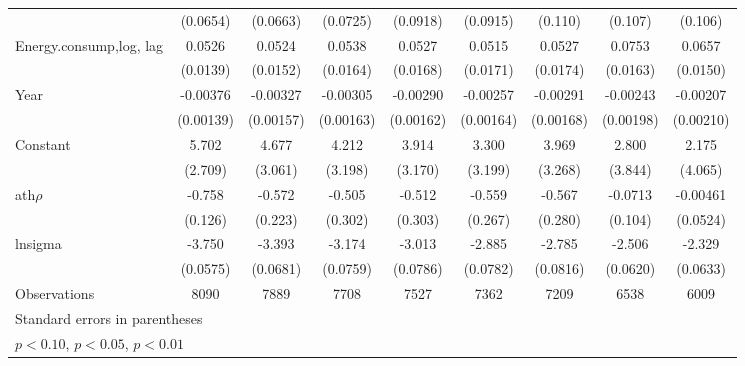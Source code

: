 \begin{table}[htbp]
\begin{tabular}{l*{8}{c}}
                    &    (0.0654)         &    (0.0663)         &    (0.0725)         &    (0.0918)         &    (0.0915)         &     (0.110)         &     (0.107)         &     (0.106)         \\
[1em]
Energy.consump,log, lag              &      0.0526\sym{***}&      0.0524\sym{***}&      0.0538\sym{***}&      0.0527\sym{***}&      0.0515\sym{***}&      0.0527\sym{***}&      0.0753\sym{***}&      0.0657\sym{***}\\
                    &    (0.0139)         &    (0.0152)         &    (0.0164)         &    (0.0168)         &    (0.0171)         &    (0.0174)         &    (0.0163)         &    (0.0150)         \\
[1em]
Year                &    -0.00376\sym{***}&    -0.00327\sym{**} &    -0.00305\sym{*}  &    -0.00290\sym{*}  &    -0.00257         &    -0.00291\sym{*}  &    -0.00243         &    -0.00207         \\
                    &   (0.00139)         &   (0.00157)         &   (0.00163)         &   (0.00162)         &   (0.00164)         &   (0.00168)         &   (0.00198)         &   (0.00210)         \\
[1em]
Constant            &       5.702\sym{**} &       4.677         &       4.212         &       3.914         &       3.300         &       3.969         &       2.800         &       2.175         \\
                    &     (2.709)         &     (3.061)         &     (3.198)         &     (3.170)         &     (3.199)         &     (3.268)         &     (3.844)         &     (4.065)         \\
\hline
ath$\rho$               &      -0.758\sym{***}&      -0.572\sym{**} &      -0.505\sym{*}  &      -0.512\sym{*}  &      -0.559\sym{**} &      -0.567\sym{**} &     -0.0713         &    -0.00461         \\
                    &     (0.126)         &     (0.223)         &     (0.302)         &     (0.303)         &     (0.267)         &     (0.280)         &     (0.104)         &    (0.0524)         \\
[1em]
lnsigma             &      -3.750\sym{***}&      -3.393\sym{***}&      -3.174\sym{***}&      -3.013\sym{***}&      -2.885\sym{***}&      -2.785\sym{***}&      -2.506\sym{***}&      -2.329\sym{***}\\
                    &    (0.0575)         &    (0.0681)         &    (0.0759)         &    (0.0786)         &    (0.0782)         &    (0.0816)         &    (0.0620)         &    (0.0633)         \\
\hline
Observations        &        8090         &        7889         &        7708         &        7527         &        7362         &        7209         &        6538         &        6009         \\
\hline\hline
\multicolumn{9}{l}{\footnotesize Standard errors in parentheses}\\
\multicolumn{9}{l}{\footnotesize \sym{*} \(p<0.10\), \sym{**} \(p<0.05\), \sym{***} \(p<0.01\)}\\
\end{tabular}
\end{table}
